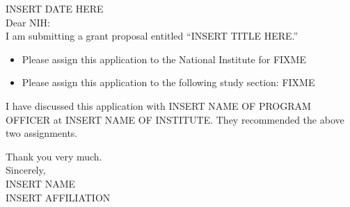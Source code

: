 \noindent
INSERT DATE HERE\\[2ex]

\noindent
Dear NIH:\\[1ex]

I am submitting a grant proposal entitled ``INSERT TITLE HERE.''

\begin{itemize}
\item Please assign this application to the National Institute for
  FIXME
\item Please assign this application to the following study section:
  FIXME
\end{itemize}
I have discussed this application with INSERT NAME OF PROGRAM OFFICER
at INSERT NAME OF INSTITUTE.  They recommended the above two
assignments.

Thank you very much.\\[1ex]

\noindent
Sincerely,\\[2ex]

\noindent
INSERT NAME\\
INSERT AFFILIATION
